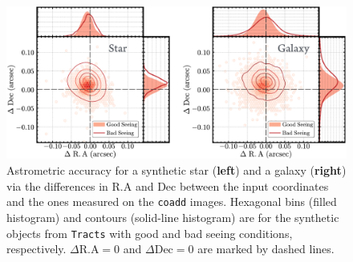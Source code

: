 \documentclass[useamsfonts]{pasj01}
\def\coadd{\texttt{coadd}}
\def\tracts{\texttt{Tracts}}
\begin{document}
\begin{figure}
    \begin{center}
        \includegraphics[width=\textwidth]{fig/synpipe_astrometry}
    \end{center}
    \caption{
        Astrometric accuracy for a synthetic star (\textbf{left}) and a galaxy
        (\textbf{right}) via the differences in R.A and Dec between the input
        coordinates and the ones measured on the \coadd{} images.
        Hexagonal bins (filled histogram) and contours (solid-line histogram) are for
        the synthetic objects from \tracts{} with good and bad seeing conditions, respectively.
        $\Delta\mathrm{R.A}=0$ and $\Delta\mathrm{Dec}=0$ are marked by dashed lines.
        }
    \label{fig:astrometry}
\end{figure}
\end{document}
